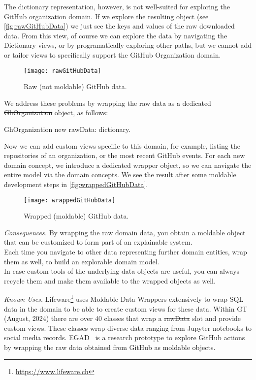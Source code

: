 \documentclass[acmsmall,screen,authorversion,nonacm]{acmart} %
\newcommand\eog[1]{\nbc{Edward}{#1}{purple}}
\newcommand{\patsec}[1]{\noindent\textit{#1.}\xspace}
\begin{document}

The dictionary representation, however, is not well-suited for exploring the GitHub organization domain.
If we explore the resulting object (see \autoref{fig:rawGitHubData}) we just see the keys and values of the raw downloaded data.
From this view, of course we can explore the data by navigating the Dictionary views, or by programatically exploring other paths, but we cannot add or tailor views to specifically support the GitHub Organization domain.

\begin{figure}[h]
  \texttt{[image: rawGitHubData]}
  \caption{Raw (not moldable) GitHub data.}
  \label{fig:rawGitHubData}
\end{figure}

We address these problems by wrapping the raw data as a dedicated \st{GhOrganization} object, as follows:
\begin{code}
GhOrganization new rawData: dictionary.
\end{code}

Now we can add custom views specific to this domain, for example, listing the repositories of an organization, or the most recent GitHub events.
For each new domain concept, we introduce a dedicated wrapper object, so we can navigate the entire model via the domain concepts.
We see the result after some moldable development steps in \autoref{fig:wrappedGitHubData}.
\begin{figure}[h]
  \texttt{[image: wrappedGitHubData]}
  \caption{Wrapped (moldable) GitHub data.}
  \label{fig:wrappedGitHubData}
\end{figure}

\patsec{Consequences}
By wrapping the raw domain data, you obtain a moldable object that can be customized to form part of an explainable system.\\
Each time you navigate to other data representing further domain entities, wrap them as well, to build an explorable domain model.\\
In case custom tools of the underlying data objects are useful, you can always recycle them and make them available to the wrapped objects as well.

\patsec{Known Uses}
Lifeware\footnote{\url{https://www.lifeware.ch}} uses Moldable Data Wrappers extensively to wrap SQL data in the  domain to be able to create custom views for these data.
Within GT (August, 2024) there are over 40 classes that wrap a \st{rawData} slot and provide custom views.
These classes wrap diverse data ranging from Jupyter notebooks to social media records.
EGAD~\cite{Vale23a} is a research prototype to explore GitHub actions by wrapping the raw data obtained from GitHub as moldable objects.
\end{document}
